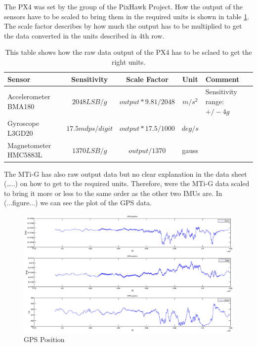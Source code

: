 \begin{description}
The PX4 was set by the group of the PixHawk Project. How the output of the sensors have to be scaled to bring them in the required units is shown in table \ref{ct_units_PX4}. The scale factor describes by how much the output has to be multiplied to get the data converted in the units described in 4th row.
\begin{table}[h]
\centering
\begin{tabular}{|p{2.5 cm}|c|c|c|p{3 cm}|}
 \hline
 Sensor & Sensitivity & Scale Factor & Unit & Comment \\
 \hline
 Accelerometer BMA180 & $2048 LSB/g$ & $output*9.81/2048$ & $m/s^2$ &     Sensitivity range: $+/- 4 g$ \\
 \hline
 Gyroscope L3GD20 & $17.5 mdps/digit$ & $output*17.5/1000$ & $deg/s$ &   \\
 \hline
 Magnetometer HMC5883L & $1370 LSB/g$ & $output/1370$ & gauss &   \\
\hline
\end {tabular}
\caption{This table shows how the raw data output of the PX4 has to be sclaed to get the right units.}
\label{ct_units_PX4}
\end{table}
The MTi-G has also raw output data but no clear explanation in the data sheet (…..) on how to get to the required units. Therefore, were the MTi-G data scaled to bring it more or less to the same order as the other two IMUs are.
In (...figure...) we can see the plot of the GPS data.
\begin{figure}[h]
\begin{center}
\includegraphics[width=1.2\textwidth]{pictures/ct_pos.eps}
\caption{GPS Position}
\label{ct_pos}
\end{center}
\end{figure}

\end{description}

